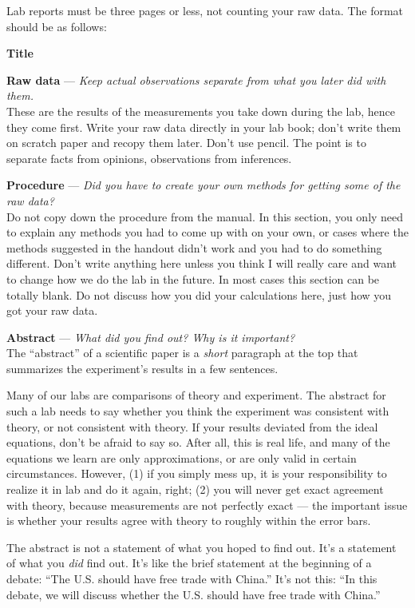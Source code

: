 
	Lab reports must be three pages or less, not counting your
raw data. The format should be as follows: 
\label{format-really-here}

\textbf{Title}

\textbf{Raw data} --- \emph{Keep actual observations separate from what you
later did with them.}\\
These are the results of the measurements you take down
during the lab, hence they come first. Write your raw data directly in your
lab book; don't write them on scratch paper and recopy them
later. Don't use pencil. The point is to separate facts from
opinions, observations from inferences.

\textbf{Procedure} --- \emph{Did you have to create your own methods for
getting some of the raw data?}\\
Do not copy down the procedure from the manual. In this
section, you only need to explain any methods you had to
come up with on your own, or cases where the methods
suggested in the handout didn't work and you had to do
something different. Don't write anything here unless you think
I will really care and want to change how we do the lab in the
future. In most cases this section can be totally blank. Do not discuss how you did your
calculations here, just how you got your raw data.

\textbf{Abstract} --- \emph{What did you find out? Why is it important?}\\
The ``abstract'' of a scientific paper is a \emph{short} paragraph
at the top that summarizes the experiment's results in a few
sentences. 

Many of our labs are comparisons of theory and experiment. The abstract
for such a lab needs to say whether you think the experiment was consistent
with theory, or not consistent with theory.
If your results deviated from the ideal equations, don't be afraid
to say so.
After all, this is real life, and many of the equations we
learn are only approximations, or are only valid in certain
circumstances. However, (1) if you simply mess up, it is
your responsibility to realize it in lab and do it again,
right; (2) you will never get exact agreement with theory,
because measurements are not perfectly exact --- the
important issue is whether your results agree with theory to
roughly within the error bars.

The abstract is not a statement of what you hoped to find out. It's
a statement of what you \emph{did} find out. It's like the brief statement
at the beginning of a debate: ``The U.S. should have free trade with China.''
It's not this: ``In this debate, we will discuss whether the U.S. should have
free trade with China.''

